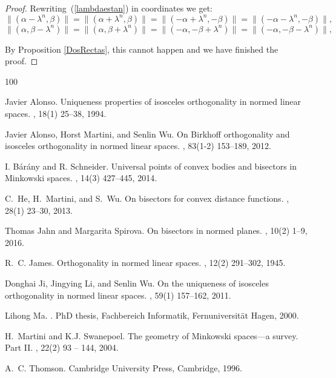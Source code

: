 \documentclass[12pt]{amsproc}
\theoremstyle{remark}
\begin{document}
\begin{proof}
Rewriting~(\ref{lambdaestan}) in coordinates we get: 
$$
\|(\alpha-\lambda^n,\beta)\|=\|(\alpha+\lambda^n,\beta)\|=\|(-\alpha+\lambda^n,-\beta)\|=\|(-\alpha-\lambda^n,-\beta)\|, 
$$
$$
\|(\alpha,\beta-\lambda^n)\|=\|(\alpha,\beta+\lambda^n)\|=\|(-\alpha,-\beta+\lambda^n)\|=\|(-\alpha,-\beta-\lambda^n)\|, 
$$

By Proposition \ref{DosRectas}, this cannot happen and we have finished the proof. 

\end{proof}

\begin{thebibliography}{100}

Javier Alonso.
\newblock Uniqueness properties of isosceles orthogonality in normed linear
  spaces.
, 18(1) 25--38, 1994.

Javier Alonso, Horst Martini, and Senlin Wu.
\newblock On {B}irkhoff orthogonality and isosceles orthogonality in normed
  linear spaces.
, 83(1-2) 153--189, 2012.

I. B\'ar\'any and R. Schneider.
\newblock Universal points of convex bodies and bisectors in Minkowski spaces.
, 14(3) 427--445, 2014.

C.~He, H.~Martini, and S.~Wu.
\newblock On bisectors for convex distance functions.
, 28(1) 23--30, 2013.

Thomas Jahn and Margarita Spirova.
\newblock On bisectors in normed planes.
, 10(2) 1--9, 2016.

R.~C. James.
\newblock Orthogonality in normed linear spaces.
, 12(2) 291--302, 1945.

Donghai Ji, Jingying Li, and Senlin Wu.
\newblock On the uniqueness of isosceles orthogonality in normed linear spaces.
, 59(1) 157--162, 2011.

Lihong Ma.
.
\newblock PhD thesis, Fachbereich Informatik, Fernuniversit{\"a}t Hagen, 2000.

H.~Martini and K.J. Swanepoel.
\newblock The geometry of {M}inkowski spaces---a survey. {P}art {II}.
, 22(2) 93 -- 144, 2004.

 A.~C. Thomson.
\newblock Cambridge University Press, Cambridge, 1996.

\end{thebibliography}




%
%
\end{document}
